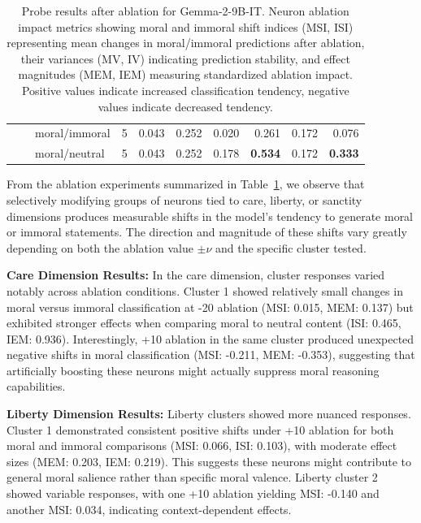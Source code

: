 \documentclass[runninghheads]{llncs}
\begin{document}
\begin{table}[!ht]
\begin{tabular}{|l|l|l|r|r|r|r|r|r|r|}
         &  & moral/immoral & 5 & 0.043 & 0.252 & 0.020 & 0.261 & 0.172 & 0.076 \\ 
         &  & moral/neutral & 5 & 0.043 & 0.252 & 0.178 & \textbf{0.534} & 0.172 & \textbf{0.333} \\ 
         \hline
    \end{tabular}
    \endgroup
        \caption{Probe results after ablation for Gemma-2-9B-IT. Neuron ablation impact metrics showing moral and immoral shift indices (MSI, ISI) representing mean changes in moral/immoral predictions after ablation, their variances (MV, IV) indicating prediction stability, and effect magnitudes (MEM, IEM) measuring standardized ablation impact. Positive values indicate increased classification tendency, negative values indicate decreased tendency.}
    \label{tab:probe_results}    
\end{table}




From the ablation experiments summarized in Table~\ref{tab:probe_results}, we observe that selectively modifying groups of neurons tied to care, liberty, or sanctity dimensions produces measurable shifts in the model's tendency to generate moral or immoral statements. The direction and magnitude of these shifts vary greatly depending on both the ablation value $\pm \nu$ and the specific cluster tested.

\textbf{Care Dimension Results:} In the care dimension, cluster responses varied notably across ablation conditions. Cluster 1 showed relatively small changes in moral versus immoral classification at -20 ablation (MSI: 0.015, MEM: 0.137) but exhibited stronger effects when comparing moral to neutral content (ISI: 0.465, IEM: 0.936). Interestingly, +10 ablation in the same cluster produced unexpected negative shifts in moral classification (MSI: -0.211, MEM: -0.353), suggesting that artificially boosting these neurons might actually suppress moral reasoning capabilities.

\textbf{Liberty Dimension Results:} Liberty clusters showed more nuanced responses. Cluster 1 demonstrated consistent positive shifts under +10 ablation for both moral and immoral comparisons (MSI: 0.066, ISI: 0.103), with moderate effect sizes (MEM: 0.203, IEM: 0.219). This suggests these neurons might contribute to general moral salience rather than specific moral valence. Liberty cluster 2 showed variable responses, with one +10 ablation yielding MSI: -0.140 and another MSI: 0.034, indicating context-dependent effects.
\end{document}
